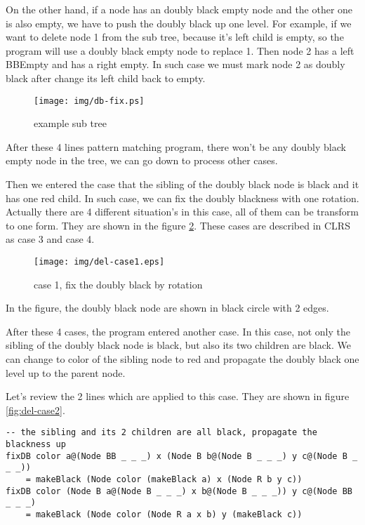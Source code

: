 \documentclass{article}
\begin{document}
On the other hand, if a node has an doubly black empty node and the other one is
also empty, we have to push the doubly black up one level. For example, if we want
to delete node 1 from the sub tree, because it's left child is empty, so the program
will use a doubly black empty node to replace 1. Then node 2 has a left BBEmpty and
has a right empty. In such case we must mark node 2 as doubly black after change its
left child back to empty.

\begin{figure}[htbp]
       \begin{center}
	\texttt{[image: img/db-fix.ps]}
        \caption{example sub tree} \label{fig:exmple-tree}
       \end{center}
\end{figure}

After these 4 lines pattern matching program, there won't be any doubly black empty
node in the tree, we can go down to process other cases.

Then we entered the case that the sibling of the doubly black node is black and it
has one red child. In such case, we can fix the doubly blackness with one rotation.
Actually there are 4 different situation's in this case, all of them can be transform
to one form. They are shown in the figure \ref{fig:del-case1}. These cases are described
in CLRS as case 3 and case 4.

\begin{figure}[htbp]
       \begin{center}
	\texttt{[image: img/del-case1.eps]}
        \caption{case 1, fix the doubly black by rotation} \label{fig:del-case1}
       \end{center}
\end{figure}

In the figure, the doubly black node are shown in black circle with 2 edges.

After these 4 cases, the program entered another case. In this case, not only the sibling
of the doubly black node is black, but also its two children are black. We can change to color
of the sibling node to red and propagate the doubly black one level up to the parent node.

Let's review the 2 lines which are applied to this case. They are shown in figure \ref{fig:del-case2}.

\begin{lstlisting}
-- the sibling and its 2 children are all black, propagate the blackness up
fixDB color a@(Node BB _ _ _) x (Node B b@(Node B _ _ _) y c@(Node B _ _ _))
    = makeBlack (Node color (makeBlack a) x (Node R b y c))
fixDB color (Node B a@(Node B _ _ _) x b@(Node B _ _ _)) y c@(Node BB _ _ _)
    = makeBlack (Node color (Node R a x b) y (makeBlack c))
\end{lstlisting}
\end{document}
